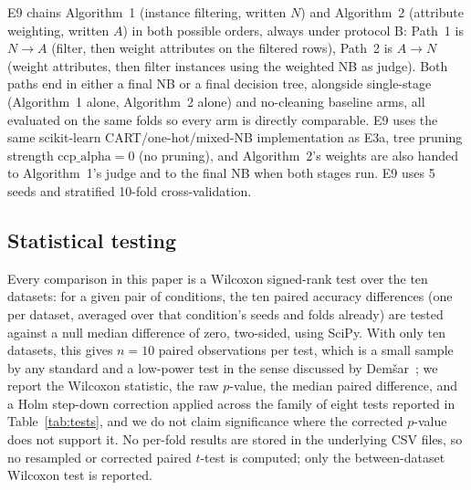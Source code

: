 E9 chains Algorithm~1 (instance filtering, written $N$) and Algorithm~2
(attribute weighting, written $A$) in both possible orders, always under
protocol B: Path~1 is $N\to A$ (filter, then weight attributes on the
filtered rows), Path~2 is $A\to N$ (weight attributes, then filter
instances using the weighted NB as judge). Both paths end in either a
final NB or a final decision tree, alongside single-stage (Algorithm~1
alone, Algorithm~2 alone) and no-cleaning baseline arms, all evaluated on
the same folds so every arm is directly comparable. E9 uses the same
scikit-learn CART/one-hot/mixed-NB implementation as E3a, tree pruning
strength $\mathrm{ccp\_alpha}=0$ (no pruning), and Algorithm~2's weights
are also handed to Algorithm~1's judge and to the final NB when both
stages run. E9 uses 5 seeds and stratified 10-fold cross-validation.

\subsection{Statistical testing}

Every comparison in this paper is a Wilcoxon signed-rank test over the ten
datasets: for a given pair of conditions, the ten paired accuracy
differences (one per dataset, averaged over that condition's seeds and
folds already) are tested against a null median difference of zero,
two-sided, using SciPy. With only ten datasets, this gives $n=10$ paired
observations per test, which is a small sample by any standard and a low-power
test in the sense discussed by Dem\v{s}ar~\cite{demsar2006statistical};
we report the Wilcoxon statistic, the raw $p$-value, the median paired
difference, and a Holm step-down correction applied across the family of
eight tests reported in Table~\ref{tab:tests}, and we do not claim
significance where the corrected $p$-value does not support it. No
per-fold results are stored in the underlying CSV files, so no
resampled or corrected paired $t$-test is computed; only the
between-dataset Wilcoxon test is reported.
